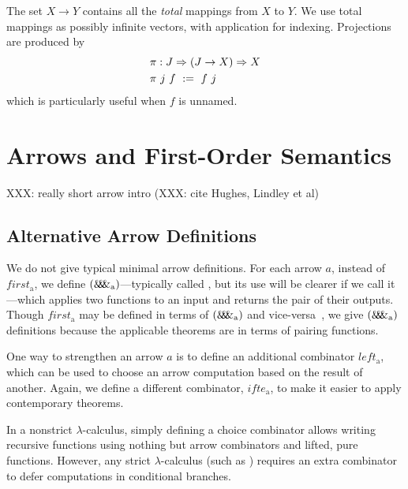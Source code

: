 \documentclass[preprint]{sigplanconf}
\newcommand{\arrowpair}{\ensuremath{\mathit{\&\mspace{-7.5mu}\&\mspace{-7.5mu}\&}}}
\newcommand{\arrowif}{\ensuremath{ifte}}
\newcommand{\gen}{_\mathrm{a}}
\begin{document}
The set $X \to Y$ contains all the \emph{total} mappings from $X$ to $Y$.
We use total mappings as possibly infinite vectors, with application for indexing.
Projections are produced by
\begin{equation}
\begin{aligned}
	&\pi : J \Rightarrow (J \to X) \Rightarrow X \\
	&\pi~j~f \ := \ f~j
\end{aligned}
\end{equation}
which is particularly useful when $f$ is unnamed.


\section{Arrows and First-Order Semantics}

XXX: really short arrow intro (XXX: cite Hughes, Lindley et al)

\subsection{Alternative Arrow Definitions}

We do not give typical minimal arrow definitions.
For each arrow $a$, instead of $first\gen$, we define $(\arrowpair\gen)$---typically called , but its use will be clearer if we call it ---which applies two functions to an input and returns the pair of their outputs.
Though $first\gen$ may be defined in terms of $(\arrowpair\gen)$ and vice-versa~\cite{cit:hughes-2005afp-arrows}, we give $(\arrowpair\gen)$ definitions because the applicable theorems are in terms of pairing functions.

One way to strengthen an arrow $a$ is to define an additional combinator $left\gen$, which can be used to choose an arrow computation based on the result of another.
Again, we define a different combinator, $\arrowif\gen$, to make it easier to apply contemporary theorems.

In a nonstrict $\lambda$-calculus, simply defining a choice combinator allows writing recursive functions using nothing but arrow combinators and lifted, pure functions.
However, any strict $\lambda$-calculus (such as \lzfclang) requires an extra combinator to defer computations in conditional branches.
\end{document}
